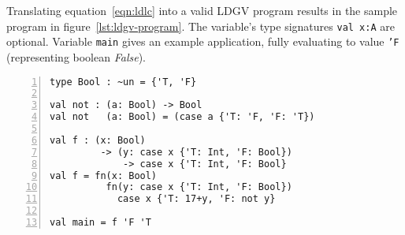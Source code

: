 Translating equation~\ref{eqn:ldlc} into a valid LDGV program results in the sample program in figure~\ref{lst:ldgv-program}. The variable's type signatures \texttt{val x:A} are optional.
Variable \texttt{main} gives an example application, fully evaluating to value \texttt{'F} (representing boolean \emph{False}).

\begin{lstlisting}[float,language=ldgv,numbers=left,
  caption=Sample LDGV program,
  label=lst:ldgv-program]
type Bool : ~un = {'T, 'F}

val not : (a: Bool) -> Bool
val not   (a: Bool) = (case a {'T: 'F, 'F: 'T})

val f : (x: Bool)
         -> (y: case x {'T: Int, 'F: Bool})
             -> case x {'T: Int, 'F: Bool}
val f = fn(x: Bool)
          fn(y: case x {'T: Int, 'F: Bool})
            case x {'T: 17+y, 'F: not y}

val main = f 'F 'T
\end{lstlisting}
